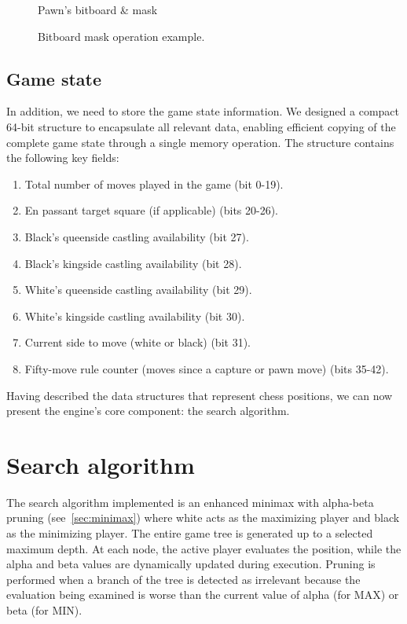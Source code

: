 \begin{figure}
\begin{minipage}[c]{0.30\textwidth}
        \caption*{Pawn's bitboard \& mask}
    \end{minipage}
    \caption{Bitboard mask operation example.}\label{fig:bitboardMaskOperation}
    \vspace{-\baselineskip}
\end{figure}

\subsection*{Game state}

\noindent In addition, we need to store the game state information. We designed a compact 64-bit structure to encapsulate all relevant data, enabling efficient copying of the complete game state through a single memory operation. The structure contains the following key fields:

\begin{enumerate}
    \item Total number of moves played in the game (bit 0-19). 
    \item En passant target square (if applicable) (bits 20-26).
    \item Black's queenside castling availability (bit 27).
    \item Black's kingside castling availability (bit 28).
    \item White's queenside castling availability (bit 29).
    \item White's kingside castling availability (bit 30).
    \item Current side to move (white or black) (bit 31).
    \item Fifty-move rule counter (moves since a capture or pawn move) (bits 35-42).
\end{enumerate}

\vspace{1em}

\noindent Having described the data structures that represent chess positions, we can now present the engine's core component: the search algorithm.

\section{Search algorithm}

The search algorithm implemented is an enhanced minimax with alpha-beta pruning (see~\cref{sec:minimax}) where white acts as the maximizing player and black as the minimizing player. The entire game tree is generated up to a selected maximum depth. At each node, the active player evaluates the position, while the alpha and beta values are dynamically updated during execution. Pruning is performed when a branch of the tree is detected as irrelevant because the evaluation being examined is worse than the current value of alpha (for MAX) or beta (for MIN).

